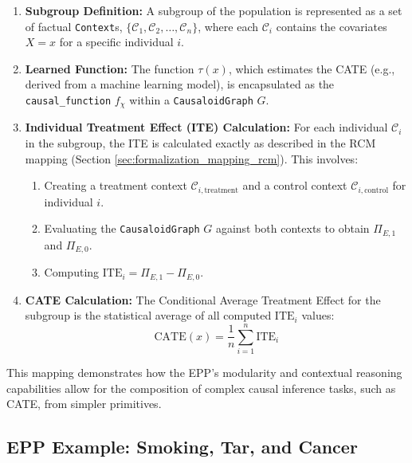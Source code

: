 \begin{enumerate}
	\item \textbf{Subgroup Definition:} A subgroup of the population is represented as a set of factual \texttt{Context}s,
      \(\{\mathcal{C}_1, \mathcal{C}_2, \dots, \mathcal{C}_n\}\), where each \(\mathcal{C}_i\) contains the covariates \(X=x\) for a
      specific individual \(i\).
    
   \item \textbf{Learned Function:} The function \(\tau(x)\), which estimates the CATE (e.g., derived from a machine learning
      model), is encapsulated as the \texttt{causal\_function} \(f_{\chi}\) within a \texttt{CausaloidGraph} \(G\).
    
   \item \textbf{Individual Treatment Effect (ITE) Calculation:} For each individual \(\mathcal{C}_i\) in the subgroup, the ITE
      is calculated exactly as described in the RCM mapping (Section \ref{sec:formalization_mapping_rcm}). This involves:
   		\begin{enumerate}
         \item Creating a treatment context \(\mathcal{C}_{i,\text{treatment}}\) and a control context \(\mathcal{C}_{i,\text
      {control}}\) for individual \(i\).
          \item Evaluating the \texttt{CausaloidGraph} \(G\) against both contexts to obtain \(\Pi_{E,1}\) and \(\Pi_{E,0}\).
         \item Computing \(\text{ITE}_i = \Pi_{E,1} - \Pi_{E,0}\).
      \end{enumerate}
    
   \item \textbf{CATE Calculation:} The Conditional Average Treatment Effect for the subgroup is the statistical average of all computed \(\text{ITE}_i\) values: \[ \text{CATE}(x) = \frac{1}{n} \sum_{i=1}^{n} \text{ITE}_i \]
\end{enumerate}

This mapping demonstrates how the EPP's modularity and contextual reasoning capabilities allow for the composition of complex causal inference tasks, such as CATE, from simpler primitives.

\newpage

\subsection{EPP Example: Smoking, Tar, and Cancer}
\label{sec:formalization_example_smoking_tar_cancer}

